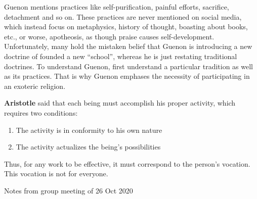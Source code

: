 Guenon mentions practices like self-purification, painful efforts, sacrifice, detachment and so on. These practices are never mentioned on social media, which instead focus on metaphysics, history of thought, boasting about books, etc., or worse, apotheosis, as though praise causes self-development. Unfortunately, many hold the mistaken belief that Guenon is introducing a new doctrine of founded a new ``school'', whereas he is just restating traditional doctrines. To understand Guenon, first understand a particular tradition as well as its practices. That is why Guenon emphases the necessity of participating in an exoteric religion.

\textbf{Aristotle} said that each being must accomplish his proper activity, which requires two conditions:

\begin{enumerate}
\item The activity is in conformity to his own nature

\item The activity actualizes the being's possibilities
\end{enumerate}


Thus, for any work to be effective, it must correspond to the person's vocation. This vocation is not for everyone.

Notes from group meeting of 26 Oct 2020



